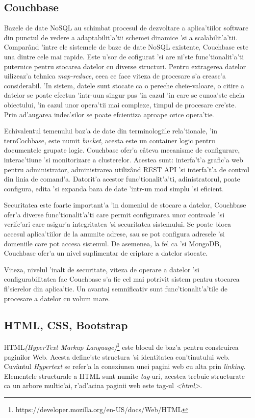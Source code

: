 \documentclass[12pt,a4paper,twoside]{report}
\begin{document}
\subsection{Couchbase}
Bazele de date NoSQL au schimbat procesul de dezvoltare a aplica'tiilor software din punctul de vedere a adaptabilit'a'tii schemei dinamice 'si a scalabilit'a'tii. Comparând 'intre ele sistemele de baze de date NoSQL existente, Couchbase\cite{learning_couchbase}  este una dintre cele mai rapide. Este u'sor de cofigurat 'si are ni'ste func'tionalit'a'ti puternice pentru stocarea datelor cu diverse structuri. Pentru extragerea datelor uilizeaz'a tehnica \textit{map-reduce}, ceea ce face viteza de procesare s'a creasc'a considerabil.  'In sistem, datele sunt stocate ca o pereche cheie-valoare, o citire a datelor se poate efectua 'intr-uun singur pas 'in cazul 'in care se cunoa'ste cheia obiectului, 'in cazul unor opera'tii mai complexe, timpul de procesare cre'ste. Prin ad'augarea indec'silor se poate efcientiza aproape orice opera'tie.

Echivalentul temenului baz'a de date din terminologiile  rela'tionale, 'in ternCochbase, este numit \textit{bucket}, acesta este un container logic pentru documentele grupate logic. Couchbase ofer'a câteva mecanisme de configurare, interac'tiune 'si monitorizare a clusterelor. Acestea sunt: interfa't'a grafic'a web pentru administrator, administrarea utilizând REST API 'si interfa't'a de control din linia de comand'a. Datorit'a acestor func'tionalit'a'ti, adinistratorul, poate configura, edita 'si expanda baza de date 'intr-un mod simplu 'si eficient.

Securitatea este foarte important'a 'in domeniul de stocare a datelor, Couchbase ofer'a diverse func'tionalit'a'ti care permit configurarea unor controale 'si verifc'ari care asigur'a integritatea 'si securitatea sistemului. Se poate bloca accesul aplica'tiilor de la anumite adrese, sau se pot configura adresele 'si domeniile care pot accesa sistemul. De asemenea, la fel ca 'si MongoDB, Couchbase ofer'a un nivel suplimentar de criptare a datelor stocate.

Viteza, nivelul 'inalt de securitate, viteza de operare a datelor 'si configurabilitatea fac Couchbase s'a fie cel mai potrivit sistem pentru stocarea fi'sierelor din aplica'tie. Un avantaj semnificativ sunt func'tionalit'a'tile de procesare a datelor cu volum mare. 

\subsection{HTML, CSS, Bootstrap}
HTML\textit{(HyperText Markup Language)}\footnote{https://developer.mozilla.org/en-US/docs/Web/HTML} este blocul de baz'a pentru construirea paginilor Web. Acesta define'ste  structura 'si identitatea con'tinutului web.  Cuvântul \textit{Hypertext} se refer'a la conexiunea unei pagini web cu alta prin \textit{linking}. Elementele structurale a HTML sunt numite \textit{tag}-uri, acestea trebuie structurate ca un arbore multic'ai, r'ad'acina paginii web este tag-ul \textit{<html>}.
\end{document}
